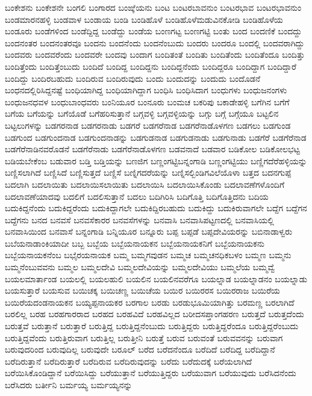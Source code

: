 {ಬಂಕೇಶನು
ಬಂಕೇಶನೇ
ಬಂಗಲಿ
ಬಂಗಾರದ
ಬಂಙ್ಕೆಯನು
ಬಂಟ
ಬಂಟರಬಾವನುಂ
ಬಂಟರಭಾವ
ಬಂಟರಭಾವನುಂ
ಬಂಡಮಾರನಹಳ್ಳಿ
ಬಂಡವಾಳ
ಬಂಡಾಯ
ಬಂಡಿ
ಬಂಡಿಹೊಳೆ
ಬಂಡಿಹೊಳೆಮಡುವಿನಕೋಡಿ
ಬಂಡಿಹೊಳೆಯ
ಬಂಡೂರು
ಬಂಡೆಗಳಿಂದ
ಬಂಡೆದ್ದಿದ್ದ
ಬಂಡೆದ್ದು
ಬಂಡೆಯ
ಬಂಣಗಟ್ಟ
ಬಂಣಗಟ್ಟಿ
ಬಂತು
ಬಂದ
ಬಂದಣಿಕೆ
ಬಂದದ್ದು
ಬಂದನಂತರ
ಬಂದನಂತರವೂ
ಬಂದನು
ಬಂದನೆಂದು
ಬಂದನೆಂಬುದು
ಬಂದರು
ಬಂದರೂ
ಬಂದಲ್ಲಿ
ಬಂದವರಾಗಿದ್ದು
ಬಂದವರು
ಬಂದವರೆಂದು
ಬಂದವರೇ
ಬಂದವು
ಬಂದಾಗ
ಬಂದಿತಂತೆ
ಬಂದಿತು
ಬಂದಿತೆಂದು
ಬಂದಿತೆಂದೂ
ಬಂದಿತ್ತು
ಬಂದಿತ್ತೆಂದು
ಬಂದಿತ್ತೆಂಬುದು
ಬಂದಿದೆ
ಬಂದಿದ್ದ
ಬಂದಿದ್ದನು
ಬಂದಿದ್ದನೆಂದು
ಬಂದಿದ್ದರೂ
ಬಂದಿದ್ದಾಗ
ಬಂದಿದ್ದಾರೆ
ಬಂದಿದ್ದು
ಬಂದಿರಬಹುದು
ಬಂದಿರುವ
ಬಂದಿರುವುದು
ಬಂದು
ಬಂದುದನ್ನು
ಬಂದುದು
ಬಂದೊಡನೆ
ಬಂಧನದಲ್ಲಿರಿಸಿದ್ದನಷ್ಟೆ
ಬಂಧಿಯಾಗಿದ್ದ
ಬಂಧಿಯಾಗಿದ್ದಾಗ
ಬಂಧಿಸಿ
ಬಂಧಿಸಿದಾಗ
ಬಂಧುಗಳು
ಬಂಧುಜನಂಗಳು
ಬಂಧುಜನಧವಳ
ಬಂಧುಬಾಂಧವರು
ಬಂನಿಯೂರ
ಬಂನೂರು
ಬಂಮಚ
ಬಕರಿಪು
ಬಕಾಡೇಹಳ್ಳಿ
ಬಗೆಗಿನ
ಬಗೆಗೆ
ಬಗೆಯ
ಬಗೆಯನ್ನು
ಬಗೆಯೊಡೆ
ಬಗೆಹರಿಸುತ್ತಾನೆ
ಬಗ್ಗವಳ್ಳಿ
ಬಗ್ಗವಳ್ಳಿಯನ್ನು
ಬಗ್ಗು
ಬಗ್ಗೆ
ಬಗ್ಗೆಯೂ
ಬಟ್ಟಲಿನ
ಬಟ್ಟಲುಗಳನ್ನು
ಬಡಗರನಾಡ
ಬಡಗರನಾಡು
ಬಡಗರೆ
ಬಡಗರೆನಾಡ
ಬಡಗರೆನಾಡೊಳಗಣ
ಬಡಗಲು
ಬಡಗುಂಡ
ಬಡಗುಂದ
ಬಡಗುಂದನಾಡ
ಬಡಗುಂದನಾಡನ್ನು
ಬಡಗುಡನಾಡ
ಬಡಗುಡನಾಡು
ಬಡಗುನಾಡು
ಬಡಗೆರೆ
ಬಡಗೆರೆನಾಡ
ಬಡಗೆರೆನಾಡಿನವರೊಡನೆ
ಬಡಗೆರೆನಾಡು
ಬಡಗೆರೆನಾಡೊಳಗಣ
ಬಡವನಾದೆ
ಬಡವಾರ
ಬಡಿಕೋಲ
ಬಡಿಕೋಲಭಟ್ಟ
ಬಡಿಯಬೇಕೆಂಬ
ಬಡುವಾರ
ಬಡ್ತಿ
ಬಡ್ತಿಯನ್ನು
ಬಣಜಿಗ
ಬಣ್ಣಂಗಟ್ಟಿಬನ್ನಂಗಾಡಿ
ಬಣ್ಣಂಗಟ್ಟಿಯು
ಬಣ್ಣಿಗದೆರೆಹಳ್ಳಿಯನ್ನು
ಬಣ್ಣಿಸಲಾಗಿದೆ
ಬಣ್ಣಿಸಿದೆ
ಬಣ್ಣಿಸುತ್ತದೆ
ಬಣ್ಣಿಸೆ
ಬಣ್ನಿಗದರೆಯನ್ನು
ಬಣ್ನಿಸಲ್ಬಿಂಡಿಗವಿಲೆಯೊಳಾ
ಬತ್ತದ
ಬದನಗುಪ್ಪೆ
ಬದಲಾಗಿ
ಬದಲಾಯಿತು
ಬದಲಾಯಿಸಲಾಯಿತು
ಬದಲಾಯಿಸಿ
ಬದಲಾಯಿಸಿಕೊಂಡು
ಬದಲಾವಣೆಗಳೊಂದಿಗೆ
ಬದಲಾವಣೆಯಾದವು
ಬದಲಿಗೆ
ಬದಲಿಸುತ್ತಾನೆ
ಬದಲು
ಬದಿಗಿರಿಸಿ
ಬದಿಗೊತ್ತಿ
ಬದಿಗೊತ್ತಿದನು
ಬದಿಯ
ಬದುಕಿದ್ದನೆಂದು
ಬದುಕಿದ್ದರೆಂದು
ಬದುಕಿದ್ದಾಗಲೇ
ಬದುಕಿದ್ದಿರಬಹುದು
ಬದುಕಿದ್ದು
ಬದುಕಿರುವಾಗಲೇ
ಬದ್ದೆಗ
ಬದ್ದೆಗನ
ಬದ್ದೆಗನು
ಬನದ
ಬನವಸೆ
ಬನವಸೆಕಾರರ
ಬನವಸೆಗಳನ್ನು
ಬನವಾಸಿ
ಬನವಾಸಿಪಟ್ಟಣದಲ್ಲಿ
ಬನವಾಸಿಯಲ್ಲಿ
ಬನವಾಸಿಯಿಂದ
ಬನವಾಸೆ
ಬನ್ನಂಗಾಡಿ
ಬನ್ನಿಯೂರ
ಬನ್ನೂರು
ಬಪ್ಪ
ಬಪ್ಪಡೆ
ಬಪ್ಪದೇವಿಯರನ್ನು
ಬಬಿನಾಡಾಳ್ವರು
ಬಬೆಯನಾಡಾಂಕಿಯಾದೀ
ಬಬ್ಬ
ಬಬ್ಬೆಯ
ಬಬ್ಬೆಯನಾಯಕನ
ಬಬ್ಬೆಯನಾಯಕನಿಗೆ
ಬಬ್ಬೆಯನಾಯಕನು
ಬಬ್ಬೆಯನಾಯಕನೆಂಬ
ಬಭೈರಯನಾಯಕ
ಬಮ್ಮ
ಬಮ್ಮಗವುಡನ
ಬಮ್ಮಚ
ಬಮ್ಮಚನಧಿಕಬಳಂ
ಬಮ್ಮಣ
ಬಮ್ಮನು
ಬಮ್ಮನೆಂಬುವವನು
ಬಮ್ಮಲ
ಬಮ್ಮಲದೇವಿ
ಬಮ್ಮಲದೇವಿಯನ್ನು
ಬಮ್ಮಲದೇವಿಯು
ಬಮ್ಮಲೆಯ
ಬಮ್ಮವ್ವೆ
ಬಯಲಮಾರ್ತಾಂಡ
ಬಯಲಲ್ಲಿ
ಬಯಲಹುಲಿ
ಬಯಲಿನ
ಬಯಲಿನವರೆಗೂ
ಬಯಲ್ನಾಡ
ಬಯಲ್ನಾಡನಂ
ಬಯಲ್ನಾಡು
ಬಯಸುತ್ತಾರೆ
ಬಯಸುವ
ಬಯಿಚಕ್ಕ
ಬಯಿಚಣ್ಣ
ಬಯಿಚೆಯ
ಬಯಿರ
ಬಯಿರರಸ
ಬಯಿರರಾಜ
ಬಯಿರೆಯ
ಬಯಿರೆಯದಂಡನಾಯಕನ
ಬಯ್ಯಪ್ಪನಾಯಕರ
ಬರಗಾಲ
ಬರಡು
ಬರಡುಭೂಮಿಯಾಗಿತ್ತು
ಬರಮಣ್ಣ
ಬರಲಾಗಿದೆ
ಬರಲಿಲ್ಲ
ಬರಹ
ಬರಹಗಾರರಾದ
ಬರಹದ
ಬರಹವಿದೆ
ಬರಹವಿಲ್ಲದ
ಬರೀದಸಪ್ತಾಂಗಹರಣ
ಬರುತ್ತದೆ
ಬರುತ್ತದೆಂದು
ಬರುತ್ತವೆ
ಬರುತ್ತಾನೆ
ಬರುತ್ತಾರೆ
ಬರುತ್ತಿದ್ದ
ಬರುತ್ತಿದ್ದನೆಂಬುದು
ಬರುತ್ತಿದ್ದರು
ಬರುತ್ತಿದ್ದರೆಂದೂ
ಬರುತ್ತಿದ್ದರೆಂಬುದು
ಬರುತ್ತಿದ್ದವೆಂದು
ಬರುತ್ತಿರುವಾಗ
ಬರುತ್ತಿಲ್ಲ
ಬರುತ್ತೀನಿ
ಬರುತ್ತೆ
ಬರುವ
ಬರುವಂತೆ
ಬರುವವನನ್ನು
ಬರುವಾಗ
ಬರುವುದರಿಂದ
ಬರುವುದಿಲ್ಲ
ಬರುವುದೇ
ಬರೂಲ್
ಬರೆದ
ಬರೆದನೆಂದೂ
ಬರೆದಿದೆ
ಬರೆದಿದ್ದ
ಬರೆದಿದ್ದಾನೆ
ಬರೆದಿರುತ್ತಾನೆ
ಬರೆದಿರುತ್ತಾರೆ
ಬರೆದಿರುವ
ಬರೆದಿರುವುದನ್ನು
ಬರೆದು
ಬರೆದುದಕ್ಕೆ
ಬರೆಯಲಾಗಿದೆ
ಬರೆಯಿಸಿಕೊಂಡಿದ್ದಾನೆ
ಬರೆಯಿಸಿದ್ದು
ಬರೆಯುತ್ತಾನೆ
ಬರೆಯುತ್ತಿದ್ದರು
ಬರೆಯುವಾಗ
ಬರೆಯುವುದು
ಬರೆಸಿದನೆಂದು
ಬರೆಸಿದರು
ಬರ್ತೀನಿ
ಬರ್ಮಯ್ಯ
ಬರ್ಮಯ್ಯನನ್ನು
}
